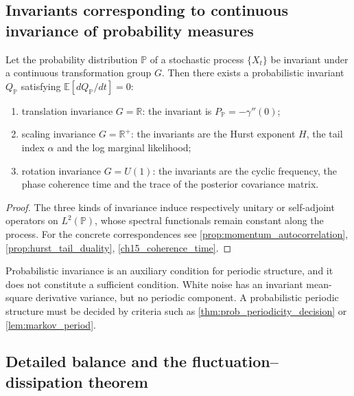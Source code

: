 \subsection{Invariants corresponding to continuous invariance of probability measures}

\begin{theorem}\label{thm:probability_noether}
Let the probability distribution $\mathbb P$ of a stochastic process $\{X_t\}$ be invariant under a continuous transformation group $G$. Then there exists a probabilistic invariant $Q_{\mathbb P}$ satisfying $\mathbb E[dQ_{\mathbb P}/dt]=0$:
\begin{enumerate}[label=(\roman*)]
    \item translation invariance $G=\mathbb R$: the invariant is $P_{\mathbb P}=-\gamma''(0)$;
    \item scaling invariance $G=\mathbb R^+$: the invariants are the Hurst exponent $H$, the tail index $\alpha$ and the log marginal likelihood;
    \item rotation invariance $G=U(1)$: the invariants are the cyclic frequency, the phase coherence time and the trace of the posterior covariance matrix.
\end{enumerate}
\end{theorem}

\begin{proof}
The three kinds of invariance induce respectively unitary or self-adjoint operators on $L^2(\mathbb P)$, whose spectral functionals remain constant along the process. For the concrete correspondences see \cref{prop:momentum_autocorrelation}, \cref{prop:hurst_tail_duality}, \cref{ch15_coherence_time}.
\end{proof}

\begin{remark}\label{rem:probability_period_scope}
Probabilistic invariance is an auxiliary condition for periodic structure, and it does not constitute a sufficient condition. White noise has an invariant mean-square derivative variance, but no periodic component. A probabilistic periodic structure must be decided by criteria such as \cref{thm:prob_periodicity_decision} or \cref{lem:markov_period}.
\end{remark}

\subsection{Detailed balance and the fluctuation--dissipation theorem}

